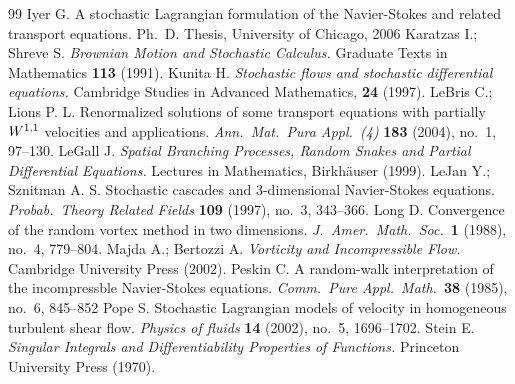 \documentclass[final]{amsart}%
\numberwithin{equation}{section}
\theoremstyle{definition}
\theoremstyle{remark}
\begin{document}
\begin{thebibliography}{99}
 Iyer G. A stochastic Lagrangian formulation of the Navier-Stokes and related transport equations. Ph.\ D. Thesis, University of Chicago, 2006
 Karatzas I.; Shreve S. \textit{Brownian Motion and Stochastic Calculus.} Graduate Texts in Mathematics \textbf{113} (1991).
 Kunita H. \textit{Stochastic flows and stochastic differential equations.} Cambridge Studies in Advanced Mathematics, \textbf{24} (1997).
 LeBris C.; Lions P. L. Renormalized solutions of some transport equations with partially $W\sp {1,1}$ velocities and applications.  \textit{Ann.\ Mat.\ Pura Appl.\ (4)} \textbf{183} (2004), no.\ 1, 97--130.
 LeGall J. \textit{Spatial Branching Processes, Random Snakes and Partial Differential Equations.} Lectures in Mathematics, Birkh\"auser (1999).
 LeJan Y.; Sznitman A. S.  Stochastic cascades and $3$-dimensional Navier-Stokes equations. \textit{Probab.\ Theory Related Fields} \textbf{109} (1997), no.\ 3, 343--366.
 Long D.  Convergence of the random vortex method in two dimensions. \textit{J.\ Amer.\ Math.\ Soc.}\ \textbf{1} (1988), no.\ 4, 779--804.
 Majda A.; Bertozzi A. \textit{Vorticity and Incompressible Flow.} Cambridge University Press (2002).
 Peskin C. A random-walk interpretation of the incompressble Navier-Stokes equations. \textit{Comm.\ Pure Appl.\ Math.}\ \textbf{38} (1985), no.\ 6, 845--852
 Pope S. Stochastic Lagrangian models of velocity in homogeneous turbulent shear flow. \textit{Physics of fluids} \textbf{14} (2002), no.\ 5, 1696--1702.
 Stein E. \textit{Singular Integrals and Differentiability Properties of Functions.} Princeton University Press (1970).

\end{thebibliography}%
\end{document}
